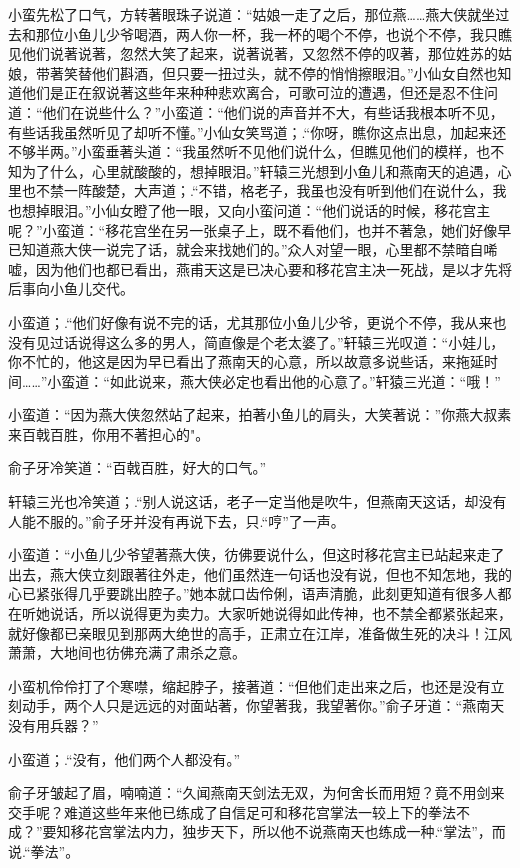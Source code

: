 \documentclass[12pt,oneside]{book}
\begin{document}
小蛮先松了口气，方转著眼珠子说道：``姑娘一走了之后，那位燕\ldots\ldots 燕大侠就坐过去和那位小鱼儿少爷喝酒，两人你一杯，我一杯的喝个不停，也说个不停，我只瞧见他们说著说著，忽然大笑了起来，说著说著，又忽然不停的叹著，那位姓苏的姑娘，带著笑替他们斟酒，但只要一扭过头，就不停的悄悄擦眼泪。''小仙女自然也知道他们是正在叙说著这些年来种种悲欢离合，可歌可泣的遭遇，但还是忍不住问道：``他们在说些什么？''小蛮道：``他们说的声音并不大，有些话我根本听不见，有些话我虽然听见了却听不懂。''小仙女笑骂道；.``你呀，瞧你这点出息，加起来还不够半两。''小蛮垂著头道：``我虽然听不见他们说什么，但瞧见他们的模样，也不知为了什么，心里就酸酸的，想掉眼泪。''轩辕三光想到小鱼儿和燕南天的追遇，心里也不禁一阵酸楚，大声道；.``不错，格老子，我虽也没有听到他们在说什么，我也想掉眼泪。''小仙女瞪了他一眼，又向小蛮问道：``他们说话的时候，移花宫主呢？''小蛮道：``移花宫坐在另一张桌子上，既不看他们，也并不著急，她们好像早已知道燕大侠一说完了话，就会来找她们的。''众人对望一眼，心里都不禁暗自唏嘘，因为他们也都已看出，燕甫天这是已决心要和移花宫主决一死战，是以才先将后事向小鱼儿交代。

小蛮道；.``他们好像有说不完的话，尤其那位小鱼儿少爷，更说个不停，我从来也没有见过话说得这么多的男人，简直像是个老太婆了。''轩辕三光叹道：``小娃儿，你不忙的，他这是因为早已看出了燕南天的心意，所以故意多说些话，来拖延时间\ldots\ldots{}''小蛮道：``如此说来，燕大侠必定也看出他的心意了。''轩猿三光道：``哦！''

小蛮道：``因为燕大侠忽然站了起来，拍著小鱼儿的肩头，大笑著说：''你燕大叔素来百戟百胜，你用不著担心的"。

俞子牙冷笑道：``百戟百胜，好大的口气。''

轩辕三光也冷笑道；.``别人说这话，老子一定当他是吹牛，但燕南天这话，却没有人能不服的。''俞子牙并没有再说下去，只.``哼''了一声。

小蛮道：``小鱼儿少爷望著燕大侠，彷佛要说什么，但这时移花宫主已站起来走了出去，燕大侠立刻跟著往外走，他们虽然连一句话也没有说，但也不知怎地，我的心已紧张得几乎要跳出腔子。''她本就口齿伶俐，语声清脆，此刻更知道有很多人都在听她说话，所以说得更为卖力。大家听她说得如此传神，也不禁全都紧张起来，就好像都已亲眼见到那两大绝世的高手，正肃立在江岸，准备做生死的决斗！江风萧萧，大地间也彷佛充满了肃杀之意。

小蛮机伶伶打了个寒噤，缩起脖子，接著道：``但他们走出来之后，也还是没有立刻动手，两个人只是远远的对面站著，你望著我，我望著你。''俞子牙道：``燕南天没有用兵器？''

小蛮道；.``没有，他们两个人都没有。''

俞子牙皱起了眉，喃喃道：``久闻燕南天剑法无双，为何舍长而用短？竟不用剑来交手呢？难道这些年来他已练成了自信足可和移花宫掌法一较上下的拳法不成？''要知移花宫掌法内力，独步天下，所以他不说燕南天也练成一种.``掌法''，而说.``拳法''。
\end{document}
